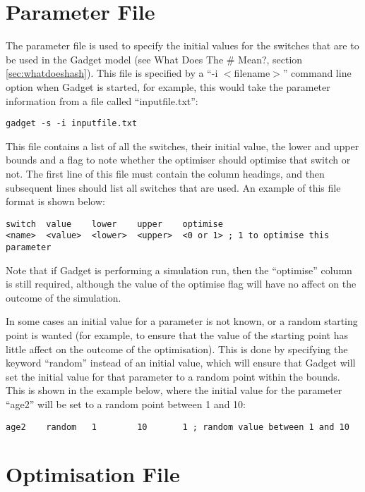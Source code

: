 \documentclass[]{book}
\begin{document}
\hypertarget{chap:param}{%
\chapter{Parameter File}\label{chap:param}}

The parameter file is used to specify the initial values for the
switches that are to be used in the Gadget model (see What Does The \#
Mean?, section \ref{sec:whatdoeshash}). This file is specified by a ``-i
\(<\)filename\(>\)'' command line option when Gadget is started, for example,
this would take the parameter information from a file called
``inputfile.txt'':

\begin{verbatim}
gadget -s -i inputfile.txt
\end{verbatim}

This file contains a list of all the switches, their initial value, the
lower and upper bounds and a flag to note whether the optimiser should
optimise that switch or not. The first line of this file must contain
the column headings, and then subsequent lines should list all switches
that are used. An example of this file format is shown below:

\begin{verbatim}
switch  value    lower    upper    optimise
<name>  <value>  <lower>  <upper>  <0 or 1> ; 1 to optimise this parameter
\end{verbatim}

Note that if Gadget is performing a simulation run, then the ``optimise''
column is still required, although the value of the optimise flag will
have no affect on the outcome of the simulation.

In some cases an initial value for a parameter is not known, or a random
starting point is wanted (for example, to ensure that the value of the
starting point has little affect on the outcome of the optimisation).
This is done by specifying the keyword ``random'' instead of an initial
value, which will ensure that Gadget will set the initial value for that
parameter to a random point within the bounds. This is shown in the
example below, where the initial value for the parameter ``age2'' will be
set to a random point between 1 and 10:

\begin{verbatim}
age2    random   1        10       1 ; random value between 1 and 10
\end{verbatim}

\hypertarget{chap:optim}{%
\chapter{Optimisation File}\label{chap:optim}}
\end{document}
